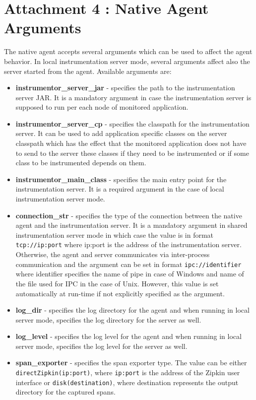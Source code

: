 \chapter*{Attachment 4 : Native Agent Arguments}
The native agent accepts several arguments which can be used to affect the agent behavior. In local instrumentation server mode, several arguments affect also the server started from the agent. Available arguments are:
\begin{itemize}
	\item \textbf{instrumentor\_server\_jar} - specifies the path to the instrumentation server JAR. It is a mandatory argument in case the instrumentation server is supposed to run per each node of monitored application.
	\item \textbf{instrumentor\_server\_cp} - specifies the classpath for the instrumentation server. It can be used to add application specific classes on the server classpath which has the effect that the monitored application does not have to send to the server these classes if they need to be instrumented or if some class to be instrumented depends on them.
	\item \textbf{instrumentor\_main\_class} - specifies the main entry point for the instrumentation server. It is a required argument in the case of local instrumentation server mode.
	\item \textbf{connection\_str} - specifies the type of the connection between the native agent and the instrumentation server. It is a mandatory argument in shared instrumentation server mode in which case the value is in format \texttt{tcp://ip:port} where ip:port is the address of the instrumentation server. Otherwise, the agent and server communicates via inter-process communication and the argument can be set in format \texttt{ipc://identifier} where identifier specifies the name of pipe in case of Windows and name of the file used for IPC in the case of Unix. However, this value is set automatically at run-time if not explicitly specified as the argument.
	\item \textbf{log\_dir} - specifies the log directory for the agent and when running in local server mode, specifies the log directory for the server as well.
	\item \textbf{log\_level} - specifies the log level for the agent and when running in local server mode, specifies the log level for the server as well.
	\item \textbf{span\_exporter} - specifies the span exporter type. The value can be either \linebreak \texttt{directZipkin(ip:port)}, where \texttt{ip:port} is the address of the Zipkin user interface or \texttt{disk(destination)}, where destination represents the output directory for the captured spans. 
	

\end{itemize}
